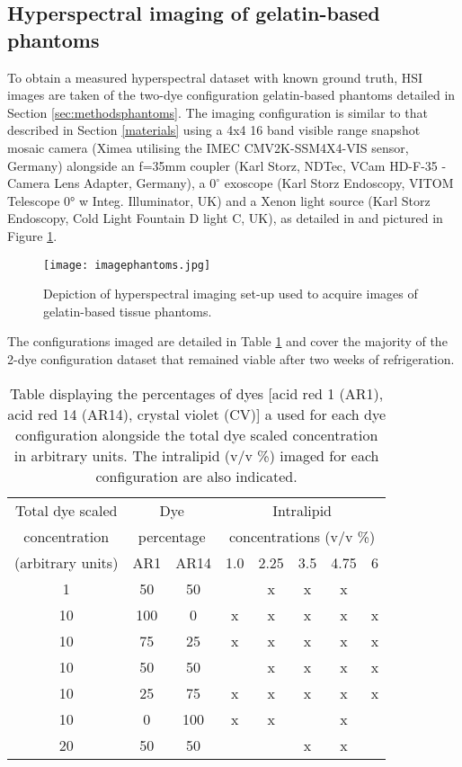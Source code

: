 \subsection{Hyperspectral imaging of gelatin-based phantoms}\label{sec:imagingphantoms}
To obtain a measured hyperspectral dataset with known ground truth, HSI images are taken of the two-dye configuration gelatin-based phantoms detailed in Section \ref{sec:methodsphantoms}. The imaging configuration is similar to that described in Section \ref{materials} using a 4x4 16 band visible range snapshot mosaic camera (Ximea utilising the IMEC CMV2K-SSM4X4-VIS sensor, Germany) alongside an f=35mm coupler (Karl Storz, NDTec, VCam HD-F-35 - Camera Lens Adapter, Germany), a $0^\circ$ exoscope (Karl Storz Endoscopy, VITOM Telescope 0° w Integ. Illuminator, UK) and a Xenon light source (Karl Storz Endoscopy, Cold Light Fountain D light C, UK), as detailed in \cite{Ebner2021} and pictured in Figure \ref{fig:imagephantoms}.
\begin{figure}[h!]
    \centering
    \texttt{[image: imagephantoms.jpg]}
    \caption{Depiction of hyperspectral imaging set-up used to acquire images of gelatin-based tissue phantoms.}
    \label{fig:imagephantoms}
\end{figure}
The configurations imaged are detailed in Table \ref{tb:imagedphantoms} and cover the majority of the 2-dye configuration dataset that remained viable after two weeks of refrigeration. 
\begin{table}[ht!]
    \centering
    \caption{Table displaying the percentages of dyes [acid red 1 (AR1), acid red 14 (AR14), crystal violet (CV)] a used for each dye configuration alongside the total dye scaled concentration in arbitrary units. The intralipid (v/v \%) imaged for each configuration are also indicated.}
    \begin{tabular}{|c|c|c|c|c|c|c|c|}
        \hline
        Total dye scaled & \multicolumn{2}{|c|}{Dye } & \multicolumn{5}{c|}{Intralipid } \\
        concentration & \multicolumn{2}{|c|}{percentage} & \multicolumn{5}{c|}{concentrations (v/v \%)} \\
        (arbitrary units) & AR1 & AR14 & 1.0 & 2.25 & 3.5 & 4.75 & 6 \\
        \hline
        1 & 50 & 50 & & x & x & x & \\
        10 & 100 & 0 & x & x & x & x & x \\
        10 & 75 & 25 & x & x & x & x & x \\
        10 & 50 & 50 &  & x & x & x & x \\
        10 & 25 & 75 & x & x & x & x & x \\
        10 & 0 & 100 & x & x &  & x & \\
        20 & 50 & 50 &  & & x & x &  \\
        \hline
    \end{tabular}
    \label{tb:imagedphantoms}
\end{table}
